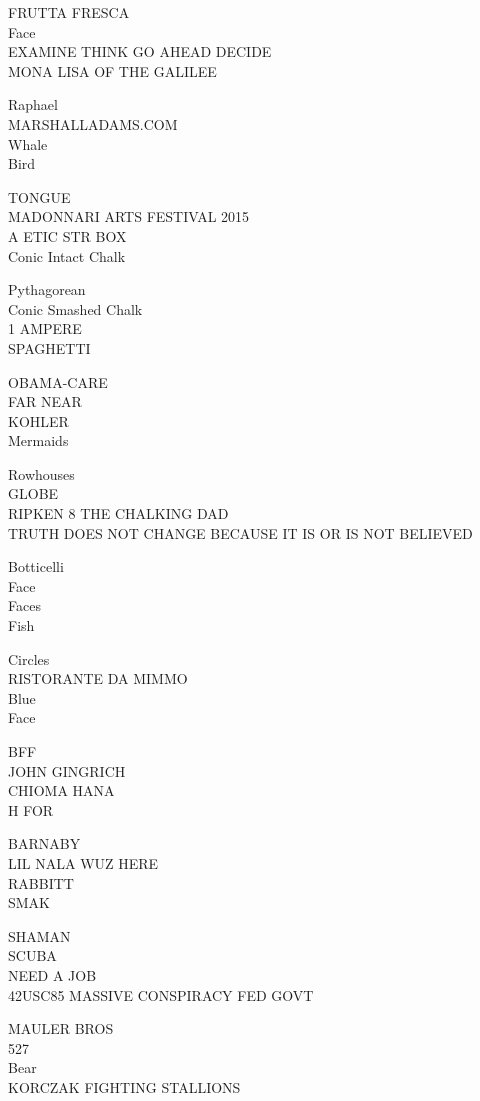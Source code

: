 \documentclass[10pt,letterpaper]{article}
\begin{document}
FRUTTA FRESCA\\
Face\\
EXAMINE THINK GO AHEAD DECIDE\\
MONA LISA OF THE GALILEE

Raphael\\
MARSHALLADAMS.COM\\
Whale\\
Bird

TONGUE\\
MADONNARI ARTS FESTIVAL 2015\\
A ETIC STR BOX\\
Conic Intact Chalk

Pythagorean\\
Conic Smashed Chalk\\
1 AMPERE\\
SPAGHETTI

OBAMA{-}CARE\\
FAR NEAR\\
KOHLER\\
Mermaids

Rowhouses\\
GLOBE\\
RIPKEN 8 THE CHALKING DAD\\
TRUTH DOES NOT CHANGE BECAUSE IT IS OR IS NOT BELIEVED

Botticelli\\
Face\\
Faces\\
Fish

Circles\\
RISTORANTE DA MIMMO\\
Blue\\
Face

BFF\\
JOHN GINGRICH\\
CHIOMA HANA\\
H FOR

BARNABY\\
LIL NALA WUZ HERE\\
RABBITT\\
SMAK

SHAMAN\\
SCUBA\\
NEED A JOB\\
42USC85 MASSIVE CONSPIRACY FED GOVT

MAULER BROS\\
527\\
Bear\\
KORCZAK FIGHTING STALLIONS
\end{document}
